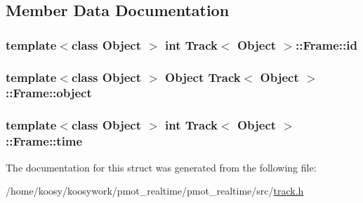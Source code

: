 \subsection{\-Member \-Data \-Documentation}
\hypertarget{struct_track_1_1_frame_a00cdf6a5e1c6eae134547cd386c8ebd3}{
\subsubsection[{id}]{\setlength{\rightskip}{0pt plus 5cm}template$<$class Object $>$ int {\bf \-Track}$<$ \-Object $>$\-::{\bf \-Frame\-::id}}}\label{struct_track_1_1_frame_a00cdf6a5e1c6eae134547cd386c8ebd3}
\hypertarget{struct_track_1_1_frame_a6bbfe33bfab1011aaddd49d35e0ecfb4}{
\subsubsection[{object}]{\setlength{\rightskip}{0pt plus 5cm}template$<$class Object $>$ \-Object {\bf \-Track}$<$ \-Object $>$\-::{\bf \-Frame\-::object}}}\label{struct_track_1_1_frame_a6bbfe33bfab1011aaddd49d35e0ecfb4}
\hypertarget{struct_track_1_1_frame_a72677957f8d88952d44074e0af30b624}{
\subsubsection[{time}]{\setlength{\rightskip}{0pt plus 5cm}template$<$class Object $>$ int {\bf \-Track}$<$ \-Object $>$\-::{\bf \-Frame\-::time}}}\label{struct_track_1_1_frame_a72677957f8d88952d44074e0af30b624}


\-The documentation for this struct was generated from the following file\-:\begin{DoxyCompactItemize}
\item 
/home/koosy/koosywork/pmot\-\_\-realtime/pmot\-\_\-realtime/src/\hyperlink{track_8h}{track.\-h}\end{DoxyCompactItemize}
